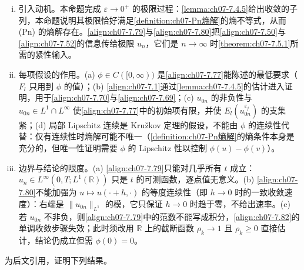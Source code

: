 ﻿\documentclass[../../main.tex]{subfiles}%
\begin{document}
\begin{remark}\label{remark:ch07-7.4.7熵解}
\begin{enumerate}[(i)]
\item 引入动机。本命题完成 $\varepsilon\to0^+$ 的极限过程：\cref{lemma:ch07-7.4.5}给出收敛的子列，本命题说明其极限恰好满足\cref{definition:ch07-Pn熵解}的熵不等式，从而 (Pn) 的熵解存在。\eqref{align:ch07-7.79}与\eqref{align:ch07-7.80}把\eqref{align:ch07-7.50}与\eqref{align:ch07-7.52}的信息传给极限 $u_n$，它们是 $n\to\infty$ 时\cref{theorem:ch07-7.5.1}所需的紧性输入。
\item 每项假设的作用。(a) $\phi\in C([0,\infty))$ 是\eqref{align:ch07-7.77}能陈述的最低要求（$F_l$ 只用到 $\phi$ 的值）；(b) \eqref{align:ch07-7.1}通过\cref{lemma:ch07-7.4.5}的估计进入证明，用于\eqref{align:ch07-7.70}与\eqref{align:ch07-7.69}；(c) $u_{0n}$ 的非负性与 $u_{0n}\in L^1\cap L^\infty$ 使\eqref{align:ch07-7.77}中的初始项有限，并使 $E_l(u_{0n}^{\varepsilon_j})$ 的支集紧；(d) 局部 Lipschitz 连续是 Kružkov 定理的假设，不能由 $\phi$ 的连续性代替：仅有连续性时熵解可能不唯一（\cref{definition:ch07-Pn熵解}的熵条件本身是充分的，但唯一性证明需要 $\phi$ 的 Lipschitz 性以控制 $\phi(u)-\phi(v)$）。
\item 边界与结论的限度。(a) \eqref{align:ch07-7.79}只能对几乎所有 $t$ 成立：$u_n\in L^\infty(0,T;L^1(\mathbb{R}))$ 只是 $t$ 的可测函数，逐点值无意义。(b) \eqref{align:ch07-7.80}不能加强为 $u\mapsto u(\cdot+h,\cdot)$ 的等度连续性（即 $h\to0$ 时的一致收敛速度）：右端是 $\|u_{0n}\|_{L^1}$ 的模，它只保证 $h\to0$ 时趋于零，不给出速率。(c) 若 $u_{0n}$ 不非负，则\eqref{align:ch07-7.79}中的范数不能写成积分，\eqref{align:ch07-7.82}的单调收敛步骤失效；此时须改用 $\mathbb{R}$ 上的截断函数 $\rho_k\to1$ 且 $\rho_k\geqslant0$ 直接估计，结论仍成立但需 $\phi(0)=0$。
\end{enumerate}
\end{remark}

为后文引用，证明下列结果。
\end{document}
